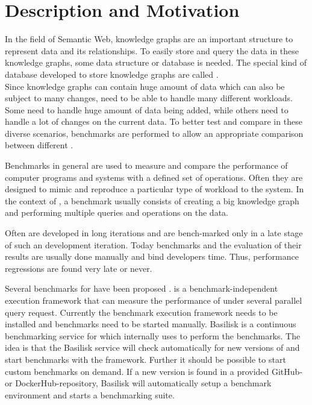 \chapter{Description and Motivation}
\label{ch:description}

In the field of Semantic Web, knowledge graphs are an important structure to represent data and its relationships.
To easily store and query the data in these knowledge graphs, some data structure or database is needed.
The special kind of database developed to store knowledge graphs are called \tsp{}. \\

Since knowledge graphs can contain huge amount of data which can also be subject to many changes, \tsp{} need to be able to handle many different workloads.
Some \tsp{} need to handle huge amount of data being added, while others need to handle a lot of changes on the current data.
To better test and compare \tsp{} in these diverse scenarios, benchmarks are performed to allow an appropriate comparison between different \tsp{}\cite{Representative_Benchmark}.

Benchmarks in general are used to measure and compare the performance of computer programs and systems with a defined set of operations.
Often they are designed to mimic and reproduce a particular type of workload to the system.
In the context of \tsp{}, a benchmark usually consists of creating a big knowledge graph and performing multiple queries and operations on the data.

Often \tsp{} are developed in long iterations and are bench-marked only in a late stage of such an development iteration.
Today benchmarks and the evaluation of their results are usually done manually and bind developers time.
Thus, performance regressions are  found very late or never.


Several benchmarks for \tsp{} have been proposed \cite{Representative_Benchmark}.
\iguana{} is a benchmark-independent execution framework \cite{IGUANA} that can measure the performance of \tsp{} under several parallel query request.
Currently the benchmark execution framework needs to be installed and benchmarks need to be started manually.
Basilisk is a continuous benchmarking service for \tsp{} which internally uses \iguana{} to perform the benchmarks.
The idea is that the Basilisk service will check automatically for new versions of \tsp{} and start benchmarks with the \iguana{} framework.
Further it should be possible to start custom benchmarks on demand.
If a new version is found in a provided GitHub- or DockerHub-repository, Basilisk will automatically setup a benchmark environment and starts a benchmarking suite.


